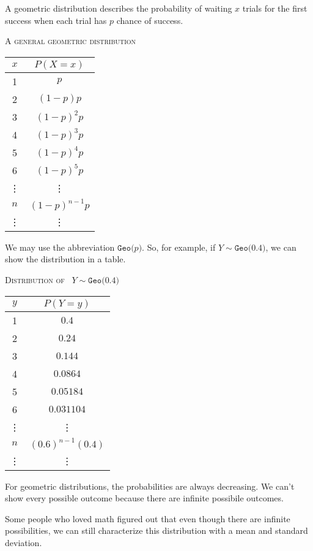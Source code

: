 \documentclass[12pt,letterpaper]{article}
\newcommand{\Geo}[1]{\texttt{Geo}\big(#1\big)}
\begin{document}
 \large
A geometric distribution describes the probability of waiting $x$ trials for the first success when each trial has $p$ chance of success.
\begin{center}
\textsc{A general geometric distribution}\\ \vspace{5pt}
\begin{tabular}{|c | c |}\hline
$x$ & $P(X=x)$ \\ \hline
1 & $p$ \\
2 & $(1-p)p$ \\
3 & $(1-p)^2p$ \\
4 & $(1-p)^3p$ \\
5 & $(1-p)^4p$ \\
6 & $(1-p)^5p$ \\
\vdots & \vdots \\
$n$ & $(1-p)^{n-1}p$ \\
\vdots & \vdots \\ \hline
\end{tabular}
\end{center}
We may use the abbreviation $\Geo{p}$. So, for example, if $Y\sim \Geo{0.4}$, we can show the distribution in a table.
\begin{center}
\textsc{Distribution of ~$Y\sim\Geo{0.4}$}\\ \vspace{5pt}
\begin{tabular}{|c | c |}\hline
$y$ & $P(Y=y)$ \\ \hline
1 & $0.4$ \\
2 & $0.24$ \\
3 & $0.144$ \\
4 & $0.0864$ \\
5 & $0.05184$ \\
6 & $0.031104$ \\
\vdots & \vdots \\
$n$ & $(0.6)^{n-1}(0.4)$ \\
\vdots & \vdots \\ \hline
\end{tabular}
\end{center}
For geometric distributions, the probabilities are always decreasing. We can't show every possible outcome because there are infinite possibile outcomes. 

Some people who loved math figured out that even though there are infinite possibilities, we can still characterize this distribution with a mean and standard deviation. 
\end{document}
